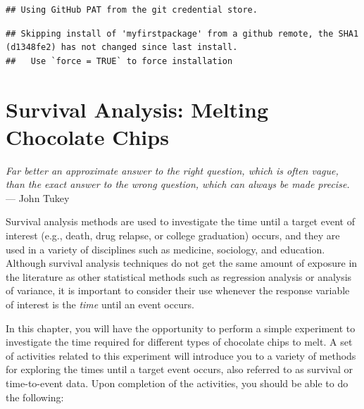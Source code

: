 \documentclass[
]{book}
\begin{document}
\begin{verbatim}
## Using GitHub PAT from the git credential store.
\end{verbatim}

\begin{verbatim}
## Skipping install of 'myfirstpackage' from a github remote, the SHA1 (d1348fe2) has not changed since last install.
##   Use `force = TRUE` to force installation
\end{verbatim}

\hypertarget{survival-analysis-melting-chocolate-chips}{%
\chapter{Survival Analysis: Melting Chocolate Chips}\label{survival-analysis-melting-chocolate-chips}}

\begin{flushright}
\emph{Far better an approximate answer to the right question, which is often vague, than the exact answer to the wrong question, which can always be made precise.} \\
— John Tukey
\end{flushright}

Survival analysis methods are used to investigate the time until a target event of interest (e.g., death, drug relapse, or college graduation) occurs, and they are used in a variety of disciplines such as medicine, sociology, and education. Although survival analysis techniques do not get the same amount of exposure in the literature as other statistical methods such as regression analysis or analysis of variance, it is important to consider their use whenever the response variable of interest is the \emph{time} until an event occurs.

In this chapter, you will have the opportunity to perform a simple experiment to investigate the time required for different types of chocolate chips to melt. A set of activities related to this experiment will introduce you to a variety of methods for exploring the times until a target event occurs, also referred to as survival or time-to-event data. Upon completion of the activities, you should be able to do the following:
\end{document}
